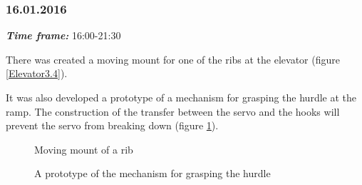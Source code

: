 \subsubsection{16.01.2016}
\textit{\textbf{Time frame:}} 16:00-21:30

There was created a moving mount for one of the ribs at the elevator (figure \ref{Elevator3.4}).

It was also developed a prototype of a mechanism for grasping the hurdle at the ramp. The construction of the transfer between the servo and the hooks will prevent the servo from breaking down (figure \ref{Hooks1.2}).

\begin{figure}[H]
	\begin{minipage}[h]{0.47\linewidth}
		\caption{Moving mount of a rib}
		\label{Elevator3.4}
	\end{minipage}
	\hfill
	\begin{minipage}[h]{0.47\linewidth}
		\caption{A prototype of the mechanism for grasping the hurdle}
		\label{Hooks1.2}
	\end{minipage}
\end{figure}
